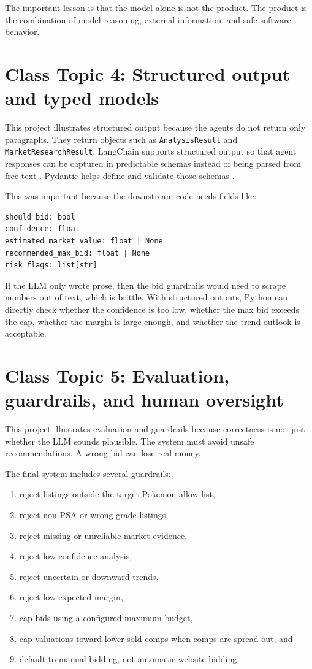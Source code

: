 \documentclass[10pt,twocolumn]{article}
\begin{document}
The important lesson is that the model alone is not the product. The product is the combination of model reasoning, external information, and safe software behavior.

\section{Class Topic 4: Structured output and typed models}

This project illustrates structured output because the agents do not return only paragraphs. They return objects such as \texttt{AnalysisResult} and \texttt{MarketResearchResult}. LangChain supports structured output so that agent responses can be captured in predictable schemas instead of being parsed from free text \cite{langchainstructured}. Pydantic helps define and validate those schemas \cite{pydanticjsonschema}.

This was important because the downstream code needs fields like:

\begin{verbatim}
should_bid: bool
confidence: float
estimated_market_value: float | None
recommended_max_bid: float | None
risk_flags: list[str]
\end{verbatim}

If the LLM only wrote prose, then the bid guardrails would need to scrape numbers out of text, which is brittle. With structured outputs, Python can directly check whether the confidence is too low, whether the max bid exceeds the cap, whether the margin is large enough, and whether the trend outlook is acceptable.

\section{Class Topic 5: Evaluation, guardrails, and human oversight}

This project illustrates evaluation and guardrails because correctness is not just whether the LLM sounds plausible. The system must avoid unsafe recommendations. A wrong bid can lose real money.

The final system includes several guardrails:
\begin{enumerate}[leftmargin=*]
    \item reject listings outside the target Pokemon allow-list,
    \item reject non-PSA or wrong-grade listings,
    \item reject missing or unreliable market evidence,
    \item reject low-confidence analysis,
    \item reject uncertain or downward trends,
    \item reject low expected margin,
    \item cap bids using a configured maximum budget,
    \item cap valuations toward lower sold comps when comps are spread out, and
    \item default to manual bidding, not automatic website bidding.
\end{enumerate}
\end{document}
